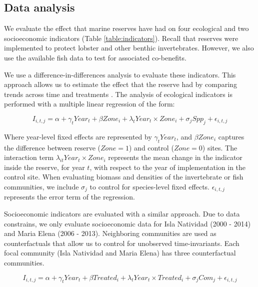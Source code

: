 \documentclass{frontiersSCNS}
\begin{document}
\hypertarget{data-analysis}{%
\subsection{Data analysis}\label{data-analysis}}

We evaluate the effect that marine reserves have had on four ecological
and two socioeconomic indicators (Table \ref{table:indicators}). Recall
that reserves were implemented to protect lobster and other benthic
invertebrates. However, we also use the available fish data to test for
associated co-benefits.

We use a difference-in-differences analysis to evaluate these
indicators. This approach allows us to estimate the effect that the
reserve had by comparing trends across time and treatments
\citep{moland_2013-VP,Villasenor-Derbez_2018}. The analysis of
ecological indicators is performed with a multiple linear regression of
the form:

\begin{equation}
I_{i,t,j} = \alpha + \gamma_{t} Year_t + \beta Zone_i + \lambda_{t} Year_t\times Zone_i + \sigma_jSpp_j + \epsilon_{i,t,j}
\label{eqn:reg_bio}
\end{equation}

Where year-level fixed effects are represented by \(\gamma_t Year_t\),
and \(\beta Zone_i\) captures the difference between reserve
(\(Zone = 1\)) and control (\(Zone = 0\)) sites. The interaction term
\(\lambda_{it} Year_t\times Zone_i\) represents the mean change in the
indicator inside the reserve, for year \(t\), with respect to the year
of implementation in the control site. When evaluating biomass and
densities of the invertebrate or fish communities, we include
\(\sigma_j\) to control for species-level fixed effects.
\(\epsilon_{i,t,j}\) represents the error term of the regression.

Socioeconomic indicators are evaluated with a similar approach. Due to
data constrains, we only evaluate socioeconomic data for Isla Natividad
(2000 - 2014) and Maria Elena (2006 - 2013). Neighboring communities are
used as counterfactuals that allow us to control for unobserved
time-invariants. Each focal community (Isla Natividad and Maria Elena)
has three counterfactual communities.

\begin{equation}
I_{i,t,j} = \alpha + \gamma_{t} Year_t + \beta Treated_i + \lambda_{t} Year_t\times Treated_i + \sigma_jCom_j +\epsilon_{i,t,j}
\label{eqn:soc_reg}
\end{equation}
\end{document}
